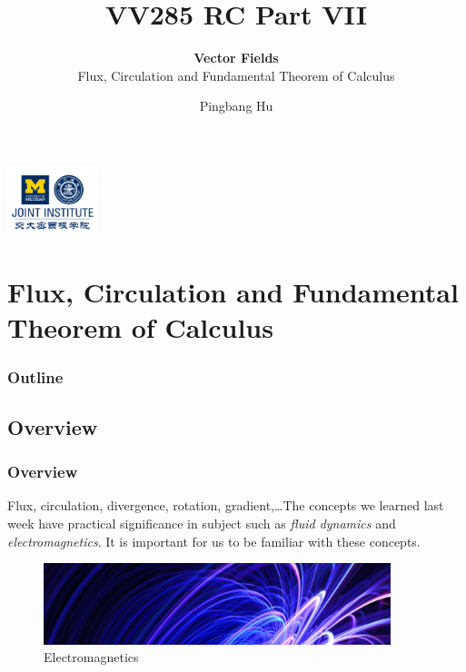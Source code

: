 \documentclass[11pt, t]{beamer}
\title{VV285 RC Part VII}
\subtitle{\textbf{Vector Fields}\\\large Flux, Circulation and Fundamental Theorem of Calculus}
\institute[UM-SJTU JI]{University of Michigan-Shanghai Jiao Tong University Joint Institute}
\author{Pingbang Hu}
\renewcommand{\emph}[1]{{\color{Turquoise3}\textsl{#1}}}
\begin{document}
\begin{frame}
    \titlepage
    \begin{center}
        \includegraphics[height=2cm]{Figures/logo/logo2.png}
    \end{center}
\end{frame}

\section{Flux, Circulation and Fundamental Theorem of Calculus}
\begin{frame}
    \frametitle{Outline}
    \begin{spacing}{1.2}
        \tableofcontents[currentsubsection,hideothersubsections,sectionstyle=hide]
    \end{spacing}
\end{frame}

\subsection{Overview}
\begin{frame}
    \frametitle{Overview}
    Flux, circulation, divergence, rotation, gradient,\dots The concepts we learned last week have practical significance in subject
    such as \emph{fluid dynamics} and \emph{electromagnetics}. It is important for us to be familiar with these concepts.
    \vspace{1cm}
    \begin{figure}[H]
    \centering
    \includegraphics[width=0.9\textwidth]{Figures/2020-07-22-15-16-33.png}
    \caption{Electromagnetics}
    \end{figure}
\end{frame}
\end{document}
